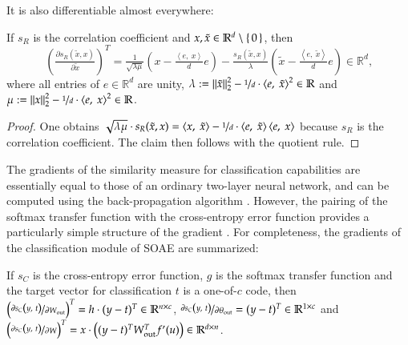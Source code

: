 \documentclass[twoside,11pt]{article}
\DeclareMathOperator{\out}{out}
\newcommand{\R}{\mathbb{R}}
\newcommand{\0}{\mathcal{O}}
\newcommand{\transp}{^T}
\newcommand{\norm}[1]{\left\Vert#1\right\Vert}
\newcommand{\scp}[2]{\left<#1,\ #2\right>}
\begin{document}
It is also differentiable almost everywhere:
\begin{proposition}
\label{prop:corrcoeff_gradient}
If $s_R$ is the correlation coefficient and $x,\tilde{x}\in\R^d\setminus\set{0}$, then
\begin{displaymath}
  \left(\tfrac{\partial s_R(\tilde{x}, x)}{\partial \tilde{x}}\right)\transp
  = \tfrac{1}{\sqrt{\lambda\mu}}\left(x - \tfrac{\scp{e}{x}}{d}e\right) - \tfrac{s_R(\tilde{x}, x)}{\lambda}\left(\tilde{x} - \tfrac{\scp{e}{\tilde{x}}}{d}e\right)\in\R^d\text{,}
\end{displaymath}
where all entries of $e\in\R^d$ are unity, $\lambda := \norm{\tilde{x}}_2^2 - \nicefrac{1}{d}\cdot\scp{e}{\tilde{x}}^2\in\R$ and $\mu := \norm{x}_2^2 - \nicefrac{1}{d}\cdot\scp{e}{x}^2\in\R$.
\end{proposition}
\begin{proof}
One obtains $\sqrt{\lambda\mu} \cdot s_R(\tilde{x}, x) = \scp{x}{\tilde{x}} - \nicefrac{1}{d}\cdot\scp{e}{\tilde{x}}\scp{e}{x}$ because $s_R$ is the correlation coefficient.
The claim then follows with the quotient rule.
\end{proof}
The gradients of the similarity measure for classification capabilities are essentially equal to those of an ordinary two-layer neural network, and can be computed using the back-propagation algorithm \citep{Rumelhart1986}.
However, the pairing of the softmax transfer function with the cross-entropy error function provides a particularly simple structure of the gradient \citep{Dunne1997}.
For completeness, the gradients of the classification module of SOAE are summarized:
\begin{proposition}
\label{prop:SOAE-grad-classf}
If $s_C$ is the cross-entropy error function, $g$ is the softmax transfer function and the target vector for classification $t$ is a one-of-$c$ code, then
$\left(\nicefrac{\partial s_C\left(y,\ t\right)}{\partial W_{\out}}\right)\transp = h\cdot (y - t)\transp\in\R^{n\times c}$,
$\nicefrac{\partial s_C\left(y,\ t\right)}{\partial \theta_{\out}} = (y - t)\transp\in\R^{1\times c}$ and
$\left(\nicefrac{\partial s_C\left(y,\ t\right)}{\partial W}\right)\transp = x \cdot \left( (y - t)\transp W_{\out}\transp f'(u)\right)\in\R^{d\times n}$.
\end{proposition}
\end{document}
